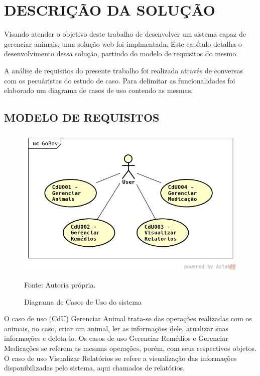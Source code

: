 %
%


\chapter{\textbf{DESCRIÇÃO DA SOLUÇÃO}}\label{chap:descSolucao}

Visando atender o objetivo deste trabalho de desenvolver um sistema capaz de gerenciar animais, uma solução web foi implmentada. Este capítulo detalha o desenvolvimento dessa solução, partindo do modelo de requisitos do mesmo.

A análise de requisitos do presente trabalho foi realizada através de conversas com os pecuáristas do estudo de caso. Para delimitar as funcionalidades foi elaborado um diagrama de casos de uso contendo as mesmas.

\section{MODELO DE REQUISITOS}

\begin{figure}[H]
	\begin{center}
		\caption{Diagrama de Casos de Uso do sistema}
		\includegraphics[width=\textwidth]{../img/casosdeuso.png}

		Fonte: Autoria própria.
	\end{center}
	\label{CdU}
\end{figure}

O caso de uso (CdU) Gerenciar Animal trata-se das operações realizadas com os animais, no caso, criar um animal, ler as informações dele, atualizar suas informações e deleta-lo. Os casos de uso Gerenciar Remédios e Gerenciar Medicações se referem as mesmas operações, porém, com seus respectivos objetos. O caso de uso Visualizar Relatórios se refere a visualização das informações disponibilizadas pelo sistema, aqui chamados de relatórios.


